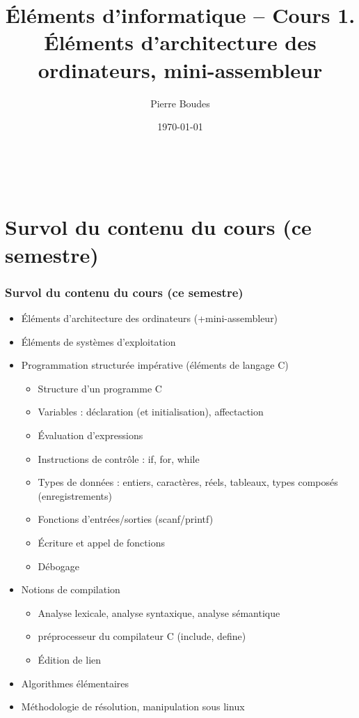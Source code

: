 \documentclass[xcolor=svgnames]{beamer}
\title{Éléments d'informatique -- Cours 1. Éléments d'architecture des
ordinateurs, mini-assembleur}
\author{Pierre Boudes}
\date{\today}
\begin{document}
\begin{frame}
	\titlepage
	\vfill
	\begin{center}
		\\[2.5ex]
		{\tiny\CcNote{\CcLongnameByNcSa}}
		\vspace*{-2.5ex}
	\end{center}
\end{frame}

\section[Plan]{}
\frame[label=plan]{\tableofcontents}

  \section[Plan du cours]{Survol du contenu du cours (ce semestre)}
\begin{frame}
  \frametitle{Survol du contenu du cours (ce semestre)\nowrite}
\pause
  \begin{itemize}
  \item Éléments d'architecture des ordinateurs (+mini-assembleur)\pause
  \item Éléments de systèmes d'exploitation\pause
\item Programmation structurée impérative (éléments de langage C)\pause
\begin{itemize}
  \item Structure d'un programme C
  \item Variables : déclaration (et initialisation), affectaction
  \item Évaluation d'expressions\pause
  \item Instructions de contrôle : if, for, while\pause
  \item Types de données : entiers, caractères,
    réels, tableaux, types composés (enregistrements)\pause
  \item Fonctions d'entrées/sorties (scanf/printf)\pause
  \item Écriture et appel de fonctions\pause
  \item Débogage\pause
\end{itemize}
\item Notions de compilation
  \begin{itemize}
  \item Analyse lexicale, analyse syntaxique, analyse sémantique
  \item préprocesseur du compilateur C (include, define)
   \item Édition de lien\pause
  \end{itemize}
\item Algorithmes élémentaires\pause
\item Méthodologie de résolution, manipulation sous linux
\end{itemize}
\end{frame}
\end{document}
